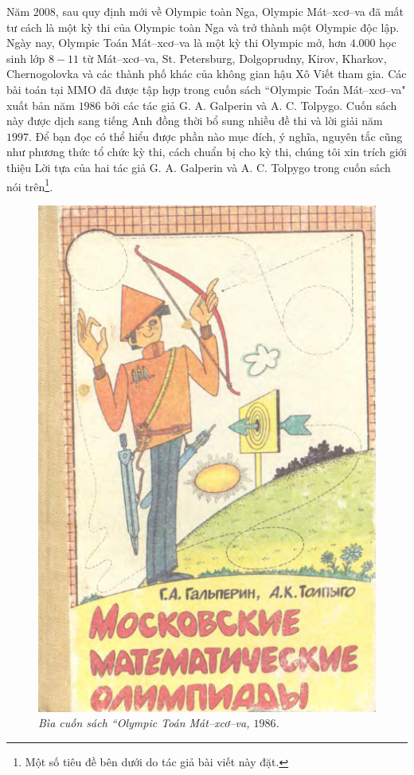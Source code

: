 \begin{multicols}{2}
	\vskip 0.1cm
	Năm $2008$, sau quy định mới về Olympic toàn Nga, Olympic Mát--xcơ--va đã mất tư cách là một kỳ thi của Olympic toàn Nga và trở thành một Olympic độc lập.
	\vskip 0.1cm
	Ngày nay, Olympic Toán Mát--xcơ--va là một kỳ thi Olympic mở, hơn $4{.}000$ học sinh lớp $8-11$ từ Mát--xcơ--va, St. Petersburg, Dolgoprudny, Kirov, Kharkov, Chernogolovka và các thành phố khác của không gian hậu Xô Viết tham gia.
	\vskip 0.1cm
	Các bài toán tại MMO đã được tập hợp trong cuốn sách ``Olympic Toán Mát--xcơ--va" xuất bản năm $1986$ bởi các tác giả G. A. Galperin và A. C. Tolpygo. Cuốn sách này được dịch sang tiếng Anh đồng thời bổ sung nhiều đề thi và lời giải năm $1997$. 
	\vskip 0.1cm
	Để bạn đọc có thể hiểu được phần nào mục đích, ý nghĩa, nguyên tắc cũng như phương thức tổ chức kỳ thi, cách chuẩn bị cho kỳ thi, chúng tôi xin trích giới thiệu Lời tựa của hai tác giả G. A. Galperin và A. C. Tolpygo trong cuốn sách nói trên\footnote[1]{\color{cackithi}Một số tiêu đề bên dưới do tác giả bài viết này đặt.}.
	\begin{figure}[H]
		\vspace*{-5pt}
		\centering
		\captionsetup{labelformat= empty, justification=centering}
		\includegraphics[width= 0.65\linewidth]{2}
		\caption{\small\textit{\color{cackithi}Bìa cuốn sách ``Olympic Toán Mát--xcơ--va, $1986$.}}
		\vspace*{-10pt}
	\end{figure}

\end{multicols}
